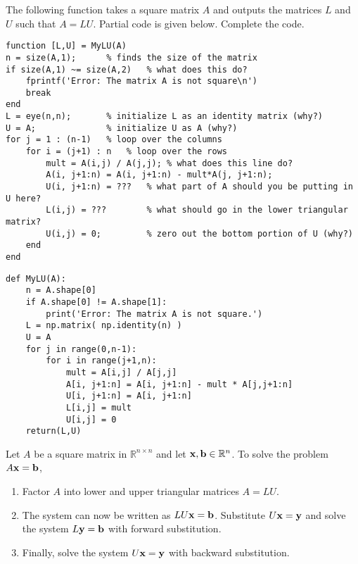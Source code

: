 \begin{technique}[LU Factorization]\label{tech:lu}
    The following \ProgLang function takes a square matrix $A$ and
    outputs the matrices $L$ and $U$ such that $A = LU$.  Partial code is given below.
    Complete the code.

\bcode
\ifnum{}
\begin{lstlisting}
function [L,U] = MyLU(A)
n = size(A,1);      % finds the size of the matrix
if size(A,1) ~= size(A,2)   % what does this do?
    fprintf('Error: The matrix A is not square\n')
    break
end
L = eye(n,n);       % initialize L as an identity matrix (why?)
U = A;              % initialize U as A (why?)
for j = 1 : (n-1)   % loop over the columns
    for i = (j+1) : n   % loop over the rows
        mult = A(i,j) / A(j,j); % what does this line do?
        A(i, j+1:n) = A(i, j+1:n) - mult*A(j, j+1:n);
        U(i, j+1:n) = ???   % what part of A should you be putting in U here?
        L(i,j) = ???        % what should go in the lower triangular matrix?
        U(i,j) = 0;         % zero out the bottom portion of U (why?)
    end
end
\end{lstlisting}
\else
\begin{lstlisting}
def MyLU(A):
    n = A.shape[0]
    if A.shape[0] != A.shape[1]:
        print('Error: The matrix A is not square.')
    L = np.matrix( np.identity(n) )
    U = A
    for j in range(0,n-1):
        for i in range(j+1,n):
            mult = A[i,j] / A[j,j]
            A[i, j+1:n] = A[i, j+1:n] - mult * A[j,j+1:n]
            U[i, j+1:n] = A[i, j+1:n]
            L[i,j] = mult
            U[i,j] = 0
    return(L,U)
\end{lstlisting}
\fi
\end{technique}

\begin{thm}
    Let $A$ be a square matrix in $\mathbb{R}^{n \times n}$ and let ${\bf x}, {\bf b} \in
    \mathbb{R}^n$.  To solve the problem $A {\bf x} ={\bf b}$,
    \begin{enumerate}
        \item Factor $A$ into lower and upper triangular matrices $A = LU$.\\
            \ifnum{}
            \else
            \fi
        \item The system can now be written as $LU {\bf x} = {\bf b}$.  Substitute $U {\bf x} = {\bf
            y}$ and solve the system $L {\bf y} = {\bf b}$ with forward substitution. \\
        \item Finally, solve the system $U {\bf x} = {\bf y}$ with backward substitution. \\
    \end{enumerate}
\end{thm}

